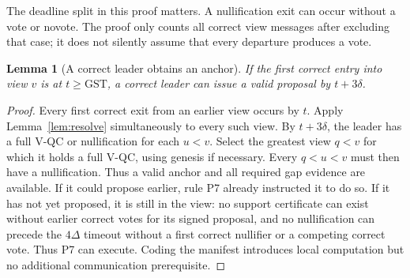 \documentclass[11pt,a4paper]{article}
\newtheorem{lemma}[theorem]{Lemma}
\theoremstyle{definition}
\newcommand{\GST}{\mathrm{GST}}
\begin{document}
The deadline split in this proof matters. A nullification exit can occur
without a vote or novote. The proof only counts all correct view messages
after excluding that case; it does not silently assume that every departure
produces a vote.

\begin{lemma}[A correct leader obtains an anchor]\label{lem:anchor}
If the first correct entry into view \(v\) is at \(t\ge\GST\), a correct
leader can issue a valid proposal by \(t+3\delta\).
\end{lemma}
\begin{proof}
Every first correct exit from an earlier view occurs by \(t\). Apply
Lemma~\ref{lem:resolve} simultaneously to every such view. By
\(t+3\delta\), the leader has a full V-QC or nullification for each
\(u<v\). Select the greatest view \(q<v\) for which it holds a full
V-QC, using genesis if necessary. Every \(q<u<v\) must then have a
nullification. Thus a valid anchor and all required gap evidence are
available. If it could propose earlier, rule P7 already instructed it to do
so. If it has not yet proposed, it is still in the view: no support
certificate can exist without earlier correct votes for its signed
proposal, and no nullification can precede the \(4\Delta\) timeout without
a first correct nullifier or a competing correct vote. Thus P7 can execute.
Coding the manifest introduces local computation but no additional
communication prerequisite.
\end{proof}
\end{document}
